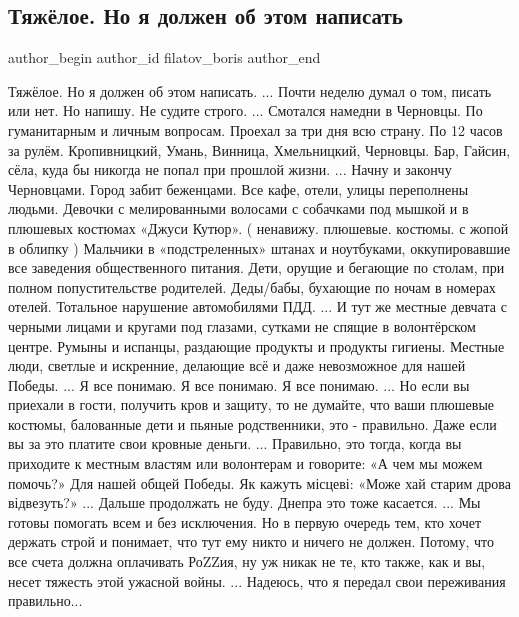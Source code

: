 
 
 
 
 
 
\subsection{Тяжёлое. Но я должен об этом написать}
\label{sec:23_04_2022.fb.filatov_boris.1.tjazheloje}
 
\ifcmt
 author_begin
   author_id filatov_boris
 author_end
\fi

\obeycr
Тяжёлое.
Но я должен об этом написать.
...
Почти неделю думал о том, писать или нет.
Но напишу.
Не судите строго.
...
Смотался намедни в Черновцы. По гуманитарным и личным вопросам.
Проехал за три дня всю страну. 
По 12 часов за рулём.
Кропивницкий, Умань, Винница, Хмельницкий, Черновцы.
Бар, Гайсин, сёла, куда бы никогда не попал при прошлой жизни.
...
Начну и закончу Черновцами.
Город забит беженцами.
Все кафе, отели, улицы переполнены людьми.
Девочки с мелированными волосами с собачками под мышкой и в плюшевых костюмах «Джуси Кутюр». 
( ненавижу. плюшевые. костюмы. с жопой в облипку )
Мальчики в «подстреленных» штанах и ноутбуками, оккупировавшие все заведения общественного питания.
Дети, орущие и бегающие по столам, при полном попустительстве родителей.
Деды/бабы, бухающие по ночам в номерах отелей.
Тотальное нарушение автомобилями  ПДД.
...
И тут же местные девчата с черными лицами и кругами под глазами, сутками не спящие в волонтёрском центре.
Румыны и испанцы, раздающие продукты и продукты гигиены.
Местные люди, светлые и искренние, делающие всё и даже невозможное для нашей Победы.
...
Я все понимаю.
Я все понимаю.
Я все понимаю.
...
Но если вы приехали в гости, получить кров и защиту, то не думайте, что ваши плюшевые костюмы, балованные дети и пьяные родственники, это - правильно.
Даже если вы за это платите свои кровные деньги.
...
Правильно, это тогда, когда вы приходите к местным властям или волонтерам и говорите: «А чем мы можем помочь?»
Для нашей общей Победы.
Як кажуть місцеві: «Може хай старим дрова відвезуть?»
...
Дальше продолжать не буду.
Днепра это тоже касается.
...
Мы готовы помогать всем и без исключения.
Но в первую очередь тем, кто хочет держать строй и понимает, что тут ему никто и ничего не должен.
Потому, что все счета должна оплачивать РоZZия, ну уж никак не те, кто также, как и вы, несет тяжесть этой ужасной войны.
...
Надеюсь, что я передал свои переживания правильно...
\restorecr

